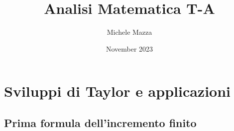 \documentclass{book}
\title{Analisi Matematica T-A}
\author{Michele Mazza}
\date{November 2023}
\begin{document}
\frontmatter
\maketitle
\tableofcontents
\mainmatter

\chapter{Sviluppi di Taylor e applicazioni}

\section{Prima formula dell'incremento finito}
\end{document}
